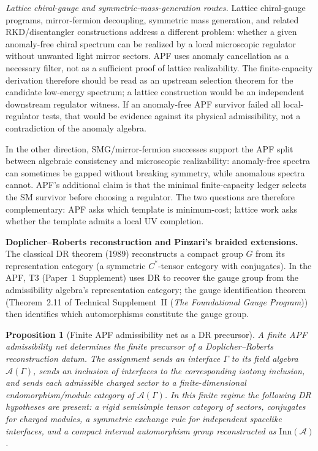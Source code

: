 \documentclass[11pt]{article}
\newtheorem{proposition}[theorem]{Proposition}
\theoremstyle{definition}
\newcommand{\TSII}{Technical Supplement~II (\emph{The Foundational Gauge Program})}
\begin{document}
\smallskip\noindent\textit{Lattice chiral-gauge and symmetric-mass-generation routes.}\quad
Lattice chiral-gauge programs, mirror-fermion decoupling, symmetric mass
generation, and related RKD/disentangler constructions address a different
problem: whether a given anomaly-free chiral spectrum can be realized by a
local microscopic regulator without unwanted light mirror sectors.  APF uses
anomaly cancellation as a necessary filter, not as a sufficient proof of
lattice realizability.  The finite-capacity derivation therefore should be
read as an upstream selection theorem for the candidate low-energy spectrum;
a lattice construction would be an independent downstream regulator witness.
If an anomaly-free APF survivor failed all local-regulator tests, that would
be evidence against its physical admissibility, not a contradiction of the
anomaly algebra.

In the other direction, SMG/mirror-fermion successes support the APF split
between algebraic consistency and microscopic realizability: anomaly-free
spectra can sometimes be gapped without breaking symmetry, while anomalous
spectra cannot.  APF's additional claim is that the minimal finite-capacity
ledger selects the SM survivor before choosing a regulator.  The two questions
are therefore complementary: APF asks which template is minimum-cost; lattice
work asks whether the template admits a local UV completion.


\smallskip\noindent\textbf{Doplicher--Roberts reconstruction and
Pinzari's braided extensions.}\quad
The classical DR theorem (1989) reconstructs a compact group $G$ from
its representation category (a symmetric $C^*$-tensor category with
conjugates).  In the APF, T3 (Paper~1 Supplement) uses DR to recover
the gauge group from the admissibility algebra's representation
category; the gauge identification theorem
(Theorem~2.11 of \TSII{}) then identifies which automorphisms
constitute the gauge group.


\begin{proposition}[Finite APF admissibility net as a DR precursor]
\label{prop:apf_dr_mapping_v34}
A finite APF admissibility net determines the finite precursor of a
Doplicher--Roberts reconstruction datum.  The assignment sends an interface
$\Gamma$ to its field algebra $\mathcal A(\Gamma)$, sends an inclusion of
interfaces to the corresponding isotony inclusion, and sends each admissible
charged sector to a finite-dimensional endomorphism/module category of
$\mathcal A(\Gamma)$.  In this finite regime the following DR hypotheses are
present: a rigid semisimple tensor category of sectors, conjugates for charged
modules, a symmetric exchange rule for independent spacelike interfaces, and a
compact internal automorphism group reconstructed as
$\mathrm{Inn}(\mathcal A)$.
\end{proposition}
\end{document}
